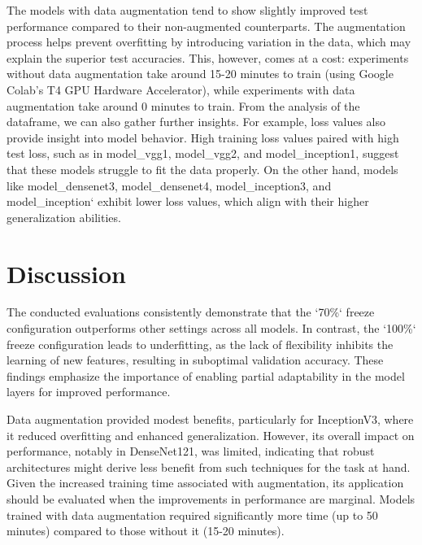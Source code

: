 \vspace{0.3cm}

The models with data augmentation tend to show slightly improved test performance compared to their non-augmented
counterparts. The augmentation process helps prevent overfitting by introducing variation in the data, which may
explain the superior test accuracies. This, however, comes at a cost: experiments without data augmentation take
around 15-20 minutes to train (using Google Colab's T4 GPU Hardware Accelerator), while experiments with data
augmentation take around 0 minutes to train.
From the analysis of the dataframe, we can also gather further insights. For example, loss values also provide insight
into model behavior. High training loss values paired with high test loss, such as in model\_vgg1, model\_vgg2, and
model\_inception1, suggest that these models struggle to fit the data properly. On the other hand, models like
model\_densenet3, model\_densenet4, model\_inception3, and model\_inception` exhibit lower loss values,
which align with their higher generalization abilities.


\section{Discussion}

The conducted evaluations consistently demonstrate that the `70\%` freeze configuration outperforms other settings across all models.
In contrast, the `100\%` freeze configuration leads to underfitting, as the lack of flexibility inhibits the learning
of new features, resulting in suboptimal validation accuracy. These findings emphasize the importance of enabling
partial adaptability in the model layers for improved performance.

\vspace{0.3cm}

Data augmentation provided modest benefits, particularly for InceptionV3, where it reduced overfitting and enhanced
generalization. However, its overall impact on performance, notably in DenseNet121, was limited, indicating that robust
architectures might derive less benefit from such techniques for the task at hand. Given the increased training time
associated with augmentation, its application should be evaluated when the improvements in performance are marginal.
Models trained with data augmentation required significantly more time (up to 50 minutes) compared to those
without it (15-20 minutes).

